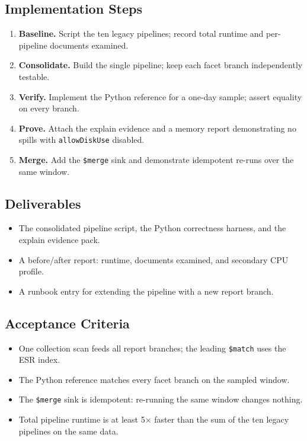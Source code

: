 \subsection*{Implementation Steps}
\begin{enumerate}
    \item \textbf{Baseline.} Script the ten legacy pipelines; record total runtime and per-pipeline documents examined.
    \item \textbf{Consolidate.} Build the single pipeline; keep each facet branch independently testable.
    \item \textbf{Verify.} Implement the Python reference for a one-day sample; assert equality on every branch.
    \item \textbf{Prove.} Attach the explain evidence and a memory report demonstrating no spills with \texttt{allowDiskUse} disabled.
    \item \textbf{Merge.} Add the \texttt{\$merge} sink and demonstrate idempotent re-runs over the same window.
\end{enumerate}

\subsection*{Deliverables}
\begin{itemize}
    \item The consolidated pipeline script, the Python correctness harness, and the explain evidence pack.
    \item A before/after report: runtime, documents examined, and secondary CPU profile.
    \item A runbook entry for extending the pipeline with a new report branch.
\end{itemize}

\subsection*{Acceptance Criteria}
\begin{itemize}
    \item One collection scan feeds all report branches; the leading \texttt{\$match} uses the ESR index.
    \item The Python reference matches every facet branch on the sampled window.
    \item The \texttt{\$merge} sink is idempotent: re-running the same window changes nothing.
    \item Total pipeline runtime is at least 5$\times$ faster than the sum of the ten legacy pipelines on the same data.
\end{itemize}

